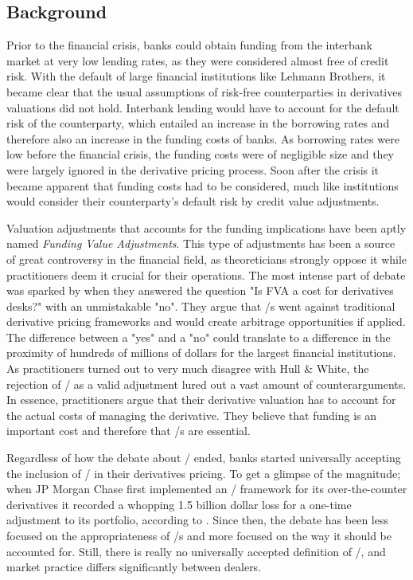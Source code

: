 \documentclass[main.tex]{subfiles}
\begin{document}
    \subsection{Background}
        
    Prior to the financial crisis, banks could obtain funding from the interbank market
    at very low lending rates, as they were considered almost free of credit risk.
    With the default of large financial institutions like Lehmann Brothers, 
    it became clear that the usual assumptions of risk-free counterparties 
    in derivatives valuations did not hold.
    Interbank lending would have to account for the default risk of the counterparty,
    which entailed an increase in the borrowing rates 
    and therefore also an increase in the funding costs of banks.
    As borrowing rates were low before the financial crisis, 
    the funding costs were of negligible size 
    and they were largely ignored in the derivative pricing process.
    Soon after the crisis it became apparent that funding costs had to be considered,
    much like institutions would consider their counterparty's default risk by 
    credit value adjustments.

    Valuation adjustments that accounts for the funding implications 
    have been aptly named \textit{Funding Value Adjustments}.
    This type of adjustments has been a source of great controversy in the financial field,
    as theoreticians strongly oppose it while practitioners deem it crucial for their operations.
    The most intense part of debate was sparked by \textcite{HullWhite2012FVA}
    when they answered the question "Is FVA a cost for derivatives desks?" 
    with an unmistakable "no".
    They argue that \FVA/s went against traditional derivative pricing frameworks
    and would create arbitrage opportunities if applied.
    The difference between a "yes" and a "no" could translate to a difference 
    in the proximity of hundreds of millions of dollars for the largest financial institutions.
    As practitioners turned out to very much disagree with Hull \& White,
    the rejection of \FVA/ as a valid adjustment lured out a vast amount of counterarguments.
    In essence, practitioners argue that their derivative valuation 
    has to account for the actual costs of managing the derivative.
    They believe that funding is an important cost and therefore that \FVA/s are essential.

    Regardless of how the debate about \FVA/ ended, banks started universally accepting the inclusion of \FVA/
    in their derivatives pricing.
    To get a glimpse of the magnitude; when JP Morgan Chase first implemented an \FVA/ framework
    for its over-the-counter derivatives it recorded a whopping 1.5 billion dollar loss
    for a one-time adjustment to its portfolio, according to \textcite{JPMorganEarnings}.
    Since then, the debate has been less focused on the appropriateness of \FVA/s
    and more focused on the way it should be accounted for.
    Still, there is really no universally accepted definition of \FVA/,
    and market practice differs significantly between dealers.
\end{document}

